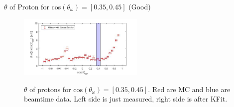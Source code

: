 \documentclass[
		10pt
		]{beamer}
\begin{document}
\begin{frame}{$ \theta$ of Proton for cos$(\theta_{\omega})=[0.35,0.45]$ (Good)}
	
		\begin{figure}
	\hspace{0cm}  \vspace{-1cm}
	\includegraphics[width=6cm]{Plots/9}
\end{figure}

	
	\begin{figure}%
		\centering
		\qquad
		\captionsetup{labelformat=empty}
		\caption{$\theta$ of protons for $\textrm{cos}(\theta_{\omega}) = [0.35, 0.45] $. Red are MC and blue are beamtime data. Left side is just measured, right side is after KFit.}%
		\label{fig:example}%
	\end{figure}
	
	
	
	
	
	
	
\end{frame}
\end{document}
